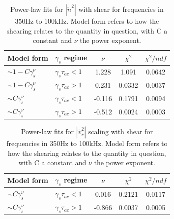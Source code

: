 \documentclass[aip,pop,amsmath,amssymb,preprint,superscriptaddress]{revtex4-1} %
\begin{document}
\begin{table}
\caption{\label{tab:table1}Power-law fits for $|\tilde{n}^{2}|$  with shear for frequencies in 350Hz to 100kHz. Model form refers to how the shearing relates to the quantity in question, with C a constant and $\nu$ the power exponent.}
\begin{ruledtabular}
\begin{tabular}{llccc}
Model form&$\gamma_{s}$ regime&$\nu$&$\chi^2$&$\chi^2/ndf$\\
\hline
$\sim 1-C\gamma_{s}^\nu$&$\gamma_{s}\tau_{ac}<1$&1.228&1.091&0.0642\\
$\sim 1-C\gamma_{s}^\nu$&$\gamma_{s}\tau_{ac}>1$&0.231&0.0332&0.0037\\
$\sim C\gamma_{s}^\nu$&$\gamma_{s}\tau_{ac}<1$&-0.116&0.1791&0.0094\\
$\sim C\gamma_{s}^\nu$&$\gamma_{s}\tau_{ac}>1$&-0.512&0.0024&0.0003\\
\end{tabular}
\end{ruledtabular}
\end{table}

\begin{table}
\caption{\label{tab:table2}Power-law fits for $|\tilde{v}_{r}^{2}|$ scaling with shear for frequencies in 350Hz to 100kHz. Model form refers to how the shearing relates to the quantity in question, with C a constant and $\nu$ the power exponent.}
\begin{ruledtabular}
\begin{tabular}{llccc}
Model form&$\gamma_{s}$ regime&$\nu$&$\chi^2$&$\chi^2/ndf$\\
\hline
$\sim C\gamma_{s}^\nu$&$\gamma_{s}\tau_{ac}<1$&0.016&0.2121&0.0117\\
$\sim C\gamma_{s}^\nu$&$\gamma_{s}\tau_{ac}>1$&-0.866&0.0037&0.0005\\
\end{tabular}
\end{ruledtabular}
\end{table}
\end{document}

